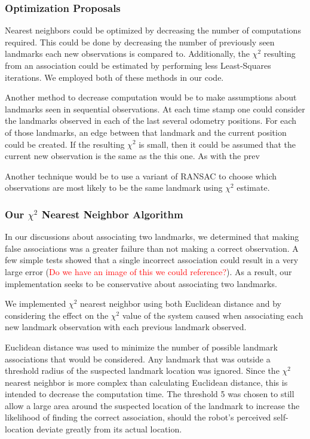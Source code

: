 \documentclass[12pt]{article}
\begin{document}
\subsubsection*{Optimization Proposals}
Nearest neighbors could be optimized by decreasing the number of computations required.  This could be done by decreasing the number of previously seen landmarks each new observations is compared to.  Additionally, the $\chi^2$ resulting from an association could be estimated by performing less Least-Squares iterations. We employed both of these methods in our code.

Another method to decrease computation would be to make assumptions about landmarks seen in sequential observations.  At each time stamp one could consider the landmarks observed in each of the last several odometry positions.  For each of those landmarks, an edge between that landmark and the current position could be created.  If the resulting $\chi^2$ is small, then it could be assumed that the current new observation is the same as the this one.  As with the prev

Another technique would be to use a variant of RANSAC to choose which observations are most likely to be the same landmark using $\chi^2$ estimate.

\subsubsection*{Our $\chi^2$ Nearest Neighbor Algorithm}
In our discussions about associating two landmarks, we determined that making false associations was a greater failure than not making a correct observation.  A few simple tests showed that a single incorrect association could result in a very large error (\textcolor{red}{Do we have an image of this we could reference?}).  As a result, our implementation seeks to be conservative about associating two landmarks.

We implemented $\chi^2$ nearest neighbor using both Euclidean distance and by considering the effect on the $\chi^2$ value of the system caused when associating each new landmark observation with each previous landmark observed.  

Euclidean distance was used to minimize the number of possible landmark associations that would be considered.  Any landmark that was outside a threshold radius of the suspected landmark location was ignored.  Since the $\chi^2$ nearest neighbor is more complex than calculating Euclidean distance, this is intended to decrease the computation time.  The threshold 5 was chosen to still allow a large area around the suspected location of the landmark to increase the likelihood of finding the correct association, should the robot's perceived self-location deviate greatly from its actual location.
\end{document}
